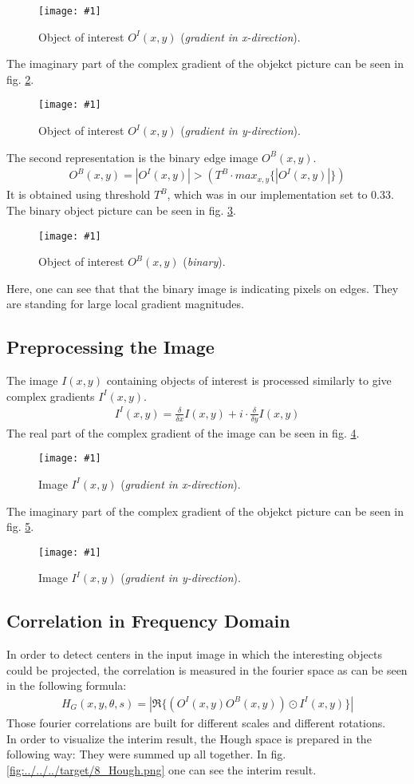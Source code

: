 \documentclass[a4paper,headings=small]{scrartcl}
\numberwithin{equation}{section} %
\numberwithin{figure}{section}   %
\newcommand{\image}[3]{
	\begin{figure}[htbp]
		\centering
		\texttt{[image: \#1]}
		\caption{#3}
		\label{fig:#1}
	\end{figure}
}
\newcommand{\generatedImgRoot}{../../../target}
\newcommand{\targetFlag}{} %
\newcommand{\templateThresh}{0.33} %
\begin{document}
\image{\generatedImgRoot/\targetFlag3_ObjectIreal.png}{0.4}{%
		Object of interest $O^I(x,y)$ (\emph{gradient in x-direction}).}

The imaginary part of the complex gradient of the objekct picture can be seen in 
fig. \ref{fig:\generatedImgRoot/\targetFlag4_ObjectIimag.png}.

\image{\generatedImgRoot/\targetFlag4_ObjectIimag.png}{0.4}{%
		Object of interest $O^I(x,y)$ (\emph{gradient in y-direction}).}
\pagebreak
The second representation is the binary edge image $O^B(x,y)$.
\begin{align}
O^B(x,y) = | O^I(x,y) | > ( T^B \cdot max_{x,y} \{| O^I(x,y) |\}) 
\end{align}
It is obtained using threshold $T^B$, which was in our implementation set to \templateThresh.
The binary object picture can be seen in fig. \ref{fig:\generatedImgRoot/\targetFlag5_ObjectB.png}.

\image{\generatedImgRoot/\targetFlag5_ObjectB.png}{0.3}{%
		Object of interest $O^B(x,y)$ (\emph{binary}).}

Here, one can see that that the binary image is indicating pixels on edges. 
They are standing for large local gradient magnitudes.
\subsection{Preprocessing the Image}

The image $I(x,y)$ containing objects of interest is processed similarly 
to give complex gradients $I^I(x,y)$.
\begin{align}
I^I(x,y) = \frac{\delta}{\delta x} I(x,y) + i \cdot \frac{\delta}{\delta y} I(x,y) 
\end{align}
The real part of the complex gradient of the image can be seen in 
fig. \ref{fig:\generatedImgRoot/\targetFlag6_ImageIreal.png}.

\image{\generatedImgRoot/\targetFlag6_ImageIreal.png}{0.5}{%
		Image $I^I(x,y)$ (\emph{gradient in x-direction}).}
\pagebreak
The imaginary part of the complex gradient of the objekct picture can be seen in 
fig. \ref{fig:\generatedImgRoot/\targetFlag7_ImageIimag.png}.

\image{\generatedImgRoot/\targetFlag7_ImageIimag.png}{0.5}{%
		Image $I^I(x,y)$ (\emph{gradient in y-direction}).}

\subsection{Correlation in Frequency Domain}
In order to detect centers in the input image in which the interesting objects could be projected,
the correlation is measured in the fourier space as can be seen in the following formula:
\begin{align}
H_G(x,y,\theta,s) = |\Re\{(O^I(x,y)O^B(x,y))\odot I^I(x,y)\}|
\end{align}
Those fourier correlations are built for different scales and different rotations.\\
In order to visualize the interim result, the Hough space is prepared in the following way:
They were summed up all together.
In fig. \ref{fig:\generatedImgRoot/\targetFlag8_Hough.png} one can see the interim result.
\end{document}
